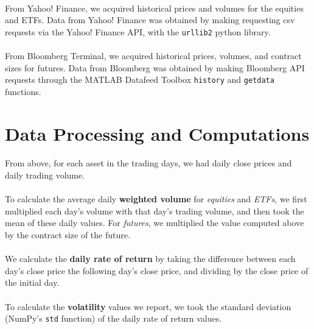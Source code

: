 \documentclass[11pt]{article}
\begin{document}
\paragraph{}
From Yahoo! Finance, we acquired historical prices and volumes for the equities and ETFs. Data from Yahoo! Finance was obtained by making requesting csv requests via the Yahoo! Finance API, with the \texttt{urllib2} python library.

\paragraph{}
From Bloomberg Terminal, we acquired historical prices, volumes, and contract sizes for  futures. Data from Bloomberg was obtained by making Bloomberg API requests through the MATLAB Datafeed Toolbox \texttt{history} and \texttt{getdata} functions.

\section{Data Processing and Computations}

\paragraph{}
From above, for each asset in the trading days, we had daily close prices and daily trading volume.

\paragraph{}
To calculate the average daily \textbf{weighted volume} for \textit{equities} and \textit{ETFs}, we first multiplied each day's volume with that day's trading volume, and then took the mean of these daily values. For \textit{futures}, we multiplied the value computed above by the contract size of the future.

\paragraph{}
We calculate the \textbf{daily rate of return} by taking the difference between each day's close price the following day's close price, and dividing by the close price of the initial day.

\paragraph{}
To calculate the \textbf{volatility} values we report, we took the standard deviation (NumPy's \texttt{std} function) of the daily rate of return values.
\end{document}
